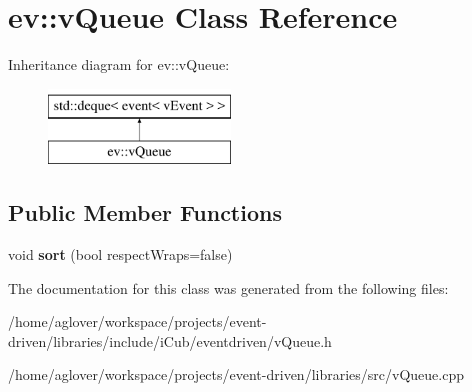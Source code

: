 \hypertarget{classev_1_1vQueue}{}\section{ev\+:\+:v\+Queue Class Reference}
\label{classev_1_1vQueue}
Inheritance diagram for ev\+:\+:v\+Queue\+:\begin{figure}[H]
\begin{center}
\leavevmode
\includegraphics[height=2.000000cm]{classev_1_1vQueue}
\end{center}
\end{figure}
\subsection*{Public Member Functions}
\begin{DoxyCompactItemize}
\item 
void {\bfseries sort} (bool respect\+Wraps=false)\hypertarget{classev_1_1vQueue_a40d7fe7c3ddca1eb9c567c0f50fede79}{}\label{classev_1_1vQueue_a40d7fe7c3ddca1eb9c567c0f50fede79}

\end{DoxyCompactItemize}


The documentation for this class was generated from the following files\+:\begin{DoxyCompactItemize}
\item 
/home/aglover/workspace/projects/event-\/driven/libraries/include/i\+Cub/eventdriven/v\+Queue.\+h\item 
/home/aglover/workspace/projects/event-\/driven/libraries/src/v\+Queue.\+cpp\end{DoxyCompactItemize}
